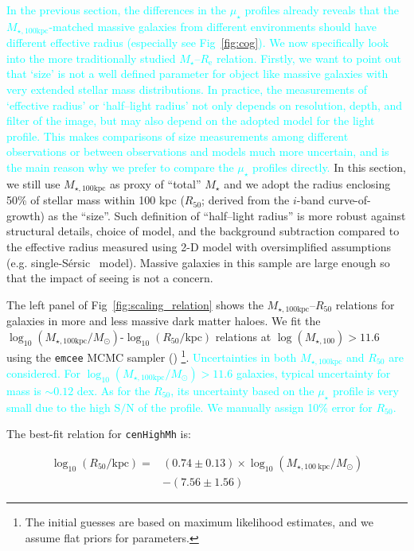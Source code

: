 \documentclass[a4paper,fleqn,usenatbib]{mnras}
\def\ser{{S\'{e}rsic\ }}
\def\rbcg{\texttt{cenHighMh}}
\def\mstar{{$M_{\star}$}}
\def\mtot{{$M_{\star,100\mathrm{kpc}}$}}
\def\logmtot{{$\log_{10} (M_{\star,100\mathrm{kpc}}/M_{\odot})$}}
\def\s2n{{$\mathrm{S}/\mathrm{N}$}}
\def\mden{{$\mu_{\star}$}}
\newcommand{\song}[1]{\textcolor{cyan}{#1}}
\begin{document}
    \song{
    In the previous section, the differences in the \mden{} profiles already reveals 
    that the \mtot{}-matched massive galaxies from different environments should have
    different effective radius (especially see Fig~\ref{fig:cog}). 
    We now specifically look into the more traditionally studied 
    \mstar{}--$R_{\mathrm{e}}$ relation.
    Firstly, we want to point out that `size' is not a well defined parameter for 
    object like massive galaxies with very extended stellar mass distributions. 
    In practice, the measurements of `effective radius' or `half--light radius' 
    not only depends on resolution, depth, and filter of the image, but may also 
    depend on the adopted model for the light profile.  
    This makes comparisons of size measurements among different observations 
    or between observations and models much more uncertain, and is the main reason
    why we prefer to compare the \mden{} profiles directly.
    }
    In this section, we still use \mtot{} as proxy of ``total'' \mstar{} and we adopt 
    the radius enclosing 50\% of stellar mass within 100 kpc ($R_{\mathrm{50}}$; 
    derived from the $i$-band curve-of-growth) as the ``size''. 
    Such definition of ``half--light radius'' is more robust against structural 
    details, choice of model, and the background subtraction compared to the 
    effective radius measured using 2-D model with oversimplified assumptions 
    (e.g. single-\ser{} model). 
    Massive galaxies in this sample are large enough so that the impact of seeing 
    is not a concern.
    
    The left panel of Fig~\ref{fig:scaling_relation} shows the 
    \mtot{}--$R_{\mathrm{50}}$ relations for galaxies in more and less massive
    dark matter haloes. 
    We fit the \logmtot{}-$\log_{10} (R_{\mathrm{50}}/\mathrm{kpc})$ relations at 
    $\log(M_{\star,100})>11.6$ using the \texttt{emcee} MCMC sampler 
    (\citealt{Emcee}) \footnote{The initial guesses are based on maximum 
    likelihood estimates, and we assume flat priors for parameters.}.
    \song{
    Uncertainties in both \mtot{} and $R_{\mathrm{50}}$ are considered. 
    For \logmtot{}$>11.6$ galaxies, typical uncertainty for mass is $\sim 0.12$
    dex.  
    As for the $R_{\mathrm{50}}$, its uncertainty based on the \mden{} profile
    is very small due to the high \s2n{} of the profile. 
    We manually assign 10\% error for $R_{\mathrm{50}}$. 
    }
    
    The best-fit relation for \rbcg{} is:
    
    \begin{equation}
        \begin{aligned}
        \log_{10} (R_{\mathrm{50}}/\mathrm{kpc}) = & (0.74\pm0.13) \times \log_{10} (M_{\star, 100\ \mathrm{kpc}}/M_{\odot}) \\ & -(7.56\pm1.56)
        \end{aligned}
    \end{equation}
\end{document}
